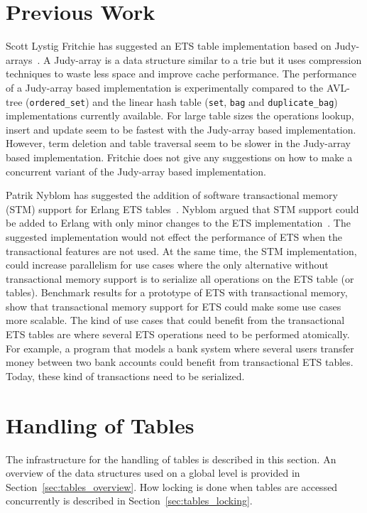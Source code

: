 \documentclass[aps,pre,preprint,nofootinbib]{revtex4}
\begin{document}
\section{Previous Work}\label{sec:previous_work}

Scott Lystig Fritchie has suggested an ETS table implementation based on Judy-arrays~\cite{ScottEtsJudy}.
A Judy-array is a data structure similar to a trie but it uses compression techniques to waste less space and improve cache performance.
The performance of a Judy-array based implementation is experimentally compared to the AVL-tree (\verb|ordered_set|) and the linear hash table (\verb|set|, \verb|bag| and \verb|duplicate_bag|) implementations currently available.
For large table sizes the operations lookup, insert and update seem to be fastest with the Judy-array based implementation.
However, term deletion and table traversal seem to be slower in the Judy-array based implementation.
Fritchie does not give any suggestions on how to make a concurrent variant of the Judy-array based implementation.

Patrik Nyblom has suggested the addition of software transactional memory (STM) support for Erlang ETS tables~\cite{PatrikErlangTrans}.
Nyblom argued that STM support could be added to Erlang with only minor changes to the ETS implementation~\cite{PatrikErlangTrans}.
The suggested implementation would not effect the performance of ETS when the transactional features are not used.
At the same time, the  STM implementation, could increase parallelism for use cases where the only alternative without transactional memory support is to serialize all operations on the ETS table (or tables).
Benchmark results for a prototype of ETS with transactional memory, show that transactional memory support for ETS could make some use cases more scalable.
The kind of use cases that could benefit from the transactional ETS tables are where several ETS operations need to be performed atomically.
For example, a program that models a bank system where several users transfer money between two bank accounts could benefit from transactional ETS tables. Today, these kind of transactions need to be serialized.

\section{Handling of Tables}

The infrastructure for the handling of tables is described in this section.
An overview of the data structures used on a global level is provided in Section~\ref{sec:tables_overview}.
How locking is done when tables are accessed concurrently is described in Section~\ref{sec:tables_locking}.
\end{document}
